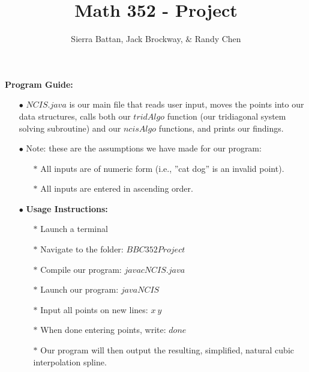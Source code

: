 \documentclass{amsart}
\begin{document}
\title{Math 352 - Project}
\author{Sierra Battan, Jack Brockway, \(\&\) Randy Chen}
\maketitle

\textbf{Program Guide:}
\begin{enumerate}
	\item[\(\bullet\)] \(NCIS.java\) is our main file that reads user input, moves the points into our data structures, calls both our \(tridAlgo\) function (our tridiagonal system solving subroutine) and our \(ncisAlgo\) functions, and prints our findings.
	\item[\(\bullet\)] Note: these are the assumptions we have made for our program:
	\begin{enumerate}
		\item[\(*\)] All inputs are of numeric form (i.e., ''cat dog'' is an invalid point).
		\item[\(*\)] All inputs are entered in ascending order.
	\end{enumerate}
	\item[\(\bullet\)] \textbf{Usage Instructions:}
	\begin{enumerate}
		\item[\(*\)] Launch a terminal
		\item[\(*\)] Navigate to the folder: \(BBC352Project\)
		\item[\(*\)] Compile our program: \(javac NCIS.java\)
		\item[\(*\)] Launch our program: \(java NCIS\)
		\item[\(*\)] Input all points on new lines: \(x \ y\)
		\item[\(*\)] When done entering points, write: \(done\)
		\item[\(*\)] Our program will then output the resulting, simplified, natural cubic interpolation spline. \smiley
	\end{enumerate}
\end{enumerate}
\end{document}
